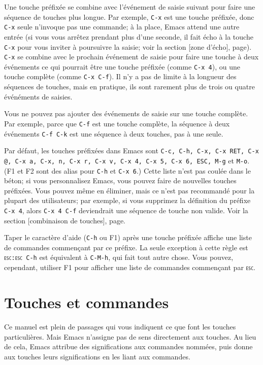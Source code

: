Une touche préfixée se combine avec l'événement de saisie suivant pour
faire une séquence de touches plus longue. Par exemple, \texttt{C-x}
est une touche préfixée, donc \texttt{C-x} seule n'invoque pas une
commande; à la place, Emacs attend une autre entrée (si vous vous
arrêtez prendant plus d'une seconde, il fait écho à la touche
\texttt{C-x} pour vous inviter à poursuivre la saisie; voir la
section [zone d'écho],
page). \texttt{C-x} se combine avec le prochain événement de
saisie pour faire une touche à deux événements ce qui pourrait être
une touche préfixée (comme \texttt{C-x 4}), ou une touche complète
(comme \texttt{C-x C-f}). Il n'y a pas de limite à la longueur des
séquences de touches, mais en pratique, ils sont rarement plus de
trois ou quatre événéments de saisies.\par 

Vous ne pouvez pas ajouter des événements de saisie sur une touche
complète. Par exemple, parce que \texttt{C-f} est une touche complète, la
séquence à deux événements \texttt{C-f C-k} est une séquence à deux
touches, pas à une seule.\par

Par défaut, les touches préfixées dans Emacs sont \texttt{C-c, C-h,
  C-x, C-x RET, C-x @, C-x a, C-x, n, C-x r, C-x v, C-x 4, C-x 5, C-x
  6, ESC, M-g} et \texttt{M-o}. (F1 et F2 sont des alias pour
\texttt{C-h} et \texttt{C-x 6}.) Cette liste n'est pas coulée dans le
béton; si vous personnalisez Emacs, vous pouvez faire de nouvelles
touches préfixées. Vous pouvez même en éliminer, mais ce n'est pas
recommandé pour la plupart des utilisateurs; par exemple, si vous
supprimez la définition du préfixe \texttt{C-x 4}, alors \texttt{C-x 4
  C-f} deviendrait une séquence de touche non valide. Voir la
section [combinaison de touches],
page.\par 

Taper le caractère d'aide (\texttt{C-h} ou F1) après une touche
préfixée affiche une liste de commandes commençant par ce préfixe. La
seule exception à cette règle est \texttt{\textsc{esc}:\textsc{esc} C-h} est
équivalent à \texttt{C-M-h}, qui fait tout autre chose. Vous pouvez,
cependant, utiliser F1 pour afficher une liste de commandes commençant
par \texttt{\textsc{esc}}.\par 

\section{Touches et commandes}
Ce manuel est plein de passages qui vous indiquent ce que font les touches
particulières. Mais Emacs n'assigne pas de sens directement aux
touches. Au lieu de cela, Emacs attribue des significations aux
commandes nommées, puis donne aux touches leurs significations en les
liant aux commandes.\par

